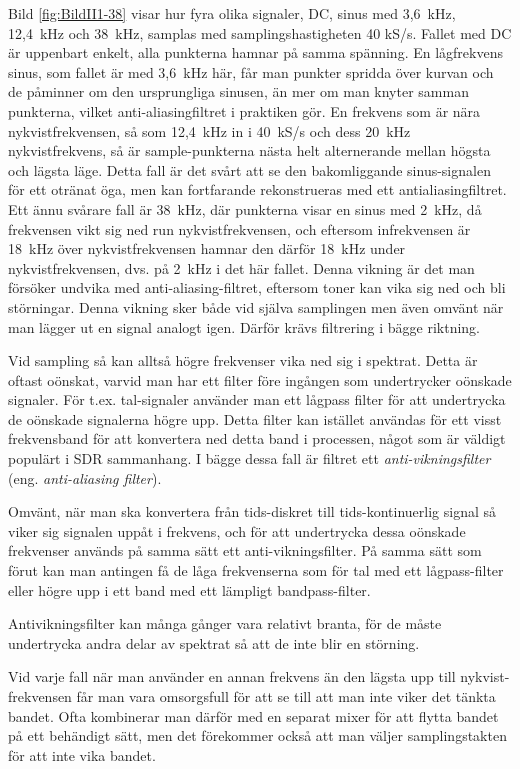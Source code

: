 Bild \ref{fig:BildII1-38} visar hur fyra olika signaler, DC, sinus med
3,6~kHz, 12,4~kHz och 38~kHz, samplas med samplingshastigheten 40 kS/s.
Fallet med DC är uppenbart enkelt, alla punkterna hamnar på samma spänning.
En lågfrekvens sinus, som fallet är med 3,6~kHz här, får man punkter spridda
över kurvan och de påminner om den ursprungliga sinusen, än mer om man knyter
samman punkterna, vilket anti-aliasingfiltret i praktiken gör.
En frekvens som är nära nykvistfrekvensen, så som 12,4~kHz in i 40~kS/s och
dess 20~kHz nykvistfrekvens, så är sample-punkterna nästa helt alternerande
mellan högsta och lägsta läge. Detta fall är det svårt att se den bakomliggande
sinus-signalen för ett otränat öga, men kan fortfarande rekonstrueras med ett
antialiasingfiltret.
Ett ännu svårare fall är 38~kHz, där punkterna visar en sinus med 2~kHz, då
frekvensen vikt sig ned run nykvistfrekvensen, och eftersom infrekvensen är
18~kHz över nykvistfrekvensen hamnar den därför 18~kHz under nykvistfrekvensen,
dvs. på 2~kHz i det här fallet. Denna vikning är det man försöker undvika med
anti-aliasing-filtret, eftersom toner kan vika sig ned och bli störningar.
Denna vikning sker både vid själva samplingen men även omvänt när man lägger ut
en signal analogt igen. Därför krävs filtrering i bägge riktning.

Vid sampling så kan alltså högre frekvenser vika ned sig i spektrat.
Detta är oftast oönskat, varvid man har ett filter före ingången som
undertrycker oönskade signaler.
För t.ex. tal-signaler använder man ett lågpass filter för att undertrycka de
oönskade signalerna högre upp.
Detta filter kan istället användas för ett visst frekvensband för att
konvertera ned detta band i processen, något som är väldigt populärt i SDR
sammanhang.
I bägge dessa fall är filtret ett \emph{anti-vikningsfilter} (eng.
\emph{anti-aliasing filter}).

Omvänt, när man ska konvertera från tids-diskret till tids-kontinuerlig
signal så viker sig signalen uppåt i frekvens, och för att undertrycka dessa
oönskade frekvenser används på samma sätt ett anti-vikningsfilter.
På samma sätt som förut kan man antingen få de låga frekvenserna som för tal
med ett lågpass-filter eller högre upp i ett band med ett lämpligt
bandpass-filter.

Antivikningsfilter kan många gånger vara relativt branta, för de måste
undertrycka andra delar av spektrat så att de inte blir en störning.

Vid varje fall när man använder en annan frekvens än den lägsta upp till
nykvist-frekvensen får man vara omsorgsfull för att se till att man inte viker
det tänkta bandet.
Ofta kombinerar man därför med en separat mixer för att flytta bandet på ett
behändigt sätt, men det förekommer också att man väljer samplingstakten för att
inte vika bandet.

